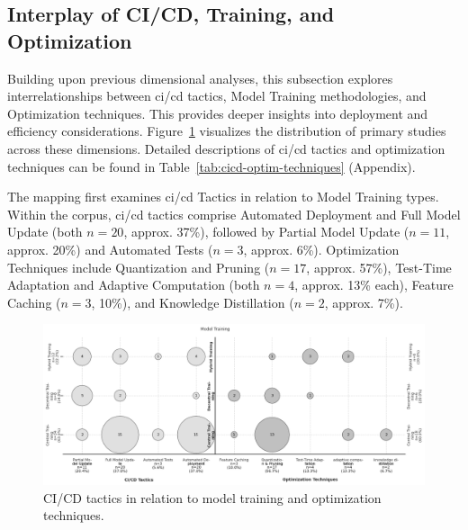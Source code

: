 \subsection{Interplay of CI/CD, Training, and Optimization}
\label{ssec:CICDTrainingOptimizationResults}

Building upon previous dimensional analyses, this subsection explores interrelationships between \gls{ci}/\gls{cd} tactics, Model Training methodologies, and Optimization techniques. This provides deeper insights into deployment and efficiency considerations. Figure~\ref{fig:bubble-chart-cicd-training-optimization} visualizes the distribution of primary studies across these dimensions. Detailed descriptions of \gls{ci}/\gls{cd} tactics and optimization techniques can be found in Table~\ref{tab:cicd-optim-techniques} (Appendix).

The mapping first examines \gls{ci}/\gls{cd} Tactics in relation to Model Training types. Within the corpus, \gls{ci}/\gls{cd} tactics comprise Automated Deployment and Full Model Update (both $n=20$, approx. 37\%), followed by Partial Model Update ($n=11$, approx. 20\%) and Automated Tests ($n=3$, approx. 6\%). Optimization Techniques include Quantization and Pruning ($n=17$, approx. 57\%), Test-Time Adaptation and Adaptive Computation (both $n=4$, approx. 13\% each), Feature Caching ($n=3$, 10\%), and Knowledge Distillation ($n=2$, approx. 7\%).

\begin{figure}[htbp]
    \centering
    \includegraphics[width=1\textwidth]{figs/research_results/sms_cicd-training-optimization.png} 
    \caption[Mapping of CI/CD Tactics, Training, and Optimization]{CI/CD tactics in relation to model training and optimization techniques.}
    \label{fig:bubble-chart-cicd-training-optimization}
\end{figure}

